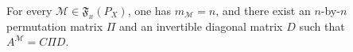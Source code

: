For every \(\mathcal M\in\mathfrak F_x(P_X)\), one has \(m_{\mathcal M}=n\), and there exist an \(n\)-by-\(n\) permutation matrix \(\Pi\) and an invertible diagonal matrix \(D\) such that \(A^{\mathcal M}=C\Pi D\).